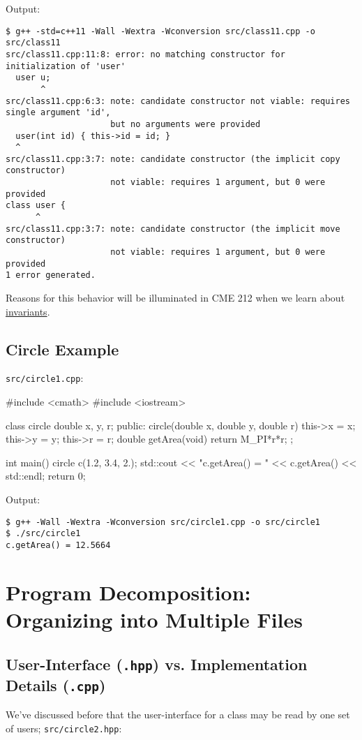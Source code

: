 \documentclass[12pt,letterpaper,twoside]{article}
\begin{document}
Output:

{\footnotesize
\begin{verbatim}
$ g++ -std=c++11 -Wall -Wextra -Wconversion src/class11.cpp -o src/class11
src/class11.cpp:11:8: error: no matching constructor for initialization of 'user'
  user u;
       ^
src/class11.cpp:6:3: note: candidate constructor not viable: requires single argument 'id', 
                     but no arguments were provided
  user(int id) { this->id = id; }
  ^
src/class11.cpp:3:7: note: candidate constructor (the implicit copy constructor) 
                     not viable: requires 1 argument, but 0 were provided
class user {
      ^
src/class11.cpp:3:7: note: candidate constructor (the implicit move constructor) 
                     not viable: requires 1 argument, but 0 were provided
1 error generated.
\end{verbatim}
}

Reasons for this behavior will be illuminated in CME 212 
when we learn about 
\href{https://en.wikipedia.org/wiki/Invariant_(mathematics)}{invariants}.

\subsection{Circle Example}
\texttt{src/circle1.cpp}:
\begin{cpp}
#include <cmath>
#include <iostream>

class circle {
  double x, y, r;
 public:
  circle(double x, double y, double r) {
    this->x = x;
    this->y = y;
    this->r = r;
  }
  double getArea(void) {
    return M_PI*r*r;
  }
};

int main() {
  circle c(1.2, 3.4, 2.);
  std::cout << "c.getArea() = " << c.getArea() << std::endl;
  return 0;
}
\end{cpp}

Output:

\begin{verbatim}
$ g++ -Wall -Wextra -Wconversion src/circle1.cpp -o src/circle1
$ ./src/circle1 
c.getArea() = 12.5664
\end{verbatim}

\section{Program Decomposition: {\large Organizing into Multiple Files}}
\subsection{User-Interface (\texttt{.hpp}) vs. Implementation Details (\texttt{.cpp})}
We've discussed before that the user-interface for a class may be read by
one set of users;
\texttt{src/circle2.hpp}:
\end{document}
